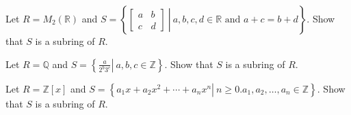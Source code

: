 
\newcommand{\C}{\mathbb{C}}
\newcommand{\Q}{\mathbb{Q}}
\newcommand{\R}{\mathbb{R}}
\newcommand{\Z}{\mathbb{Z}}


Let $R=M_2(\R)$ and $S=\left\{\left.\begin{bmatrix}a&b\\c&d\end{bmatrix}\ \right|\ a,b,c,d\in\R\text{ and }a+c=b+d\right\}$.  Show that $S$ is a subring of $R$.
	

Let $R=\Q$ and $S=\left\{\left.\frac{a}{2^b3^c}\right|\ a,b,c\in\Z\right\}$.  Show that $S$ is a subring of $R$.
	

Let $R=\Z[x]$ and $S=\left\{\left.a_1x+a_2x^2+\cdots+a_nx^n\right|\ n\geq 0. a_1,a_2,\dots,a_n\in\Z\right\}$.  Show that $S$ is a subring of $R$.